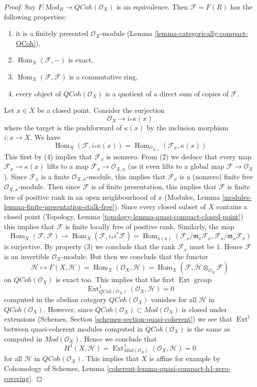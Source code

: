\documentclass{stacks-project}
\theoremstyle{plain}
\theoremstyle{definition}
\theoremstyle{remark}
\numberwithin{equation}{subsection}
\def\Hom{\mathop{\mathrm{Hom}}\nolimits}
\def\Ext{\mathop{\mathrm{Ext}}\nolimits}
\def\QCoh{\mathit{QCoh}}
\begin{document}
\begin{proof}
Say $F : \text{Mod}_R \to \QCoh(\mathcal{O}_X)$ is an equivalence.
Then $\mathcal{F} = F(R)$ has the following properties:
\begin{enumerate}
\item it is a finitely presented $\mathcal{O}_X$-module
(Lemma \ref{lemma-categorically-compact-QCoh}),
\item $\Hom_X(\mathcal{F}, -)$ is exact,
\item $\Hom_X(\mathcal{F}, \mathcal{F})$ is a commutative ring,
\item every object of $\QCoh(\mathcal{O}_X)$ is a quotient of
a direct sum of copies of $\mathcal{F}$.
\end{enumerate}
Let $x \in X$ be a closed point. Consider the surjection
$$
\mathcal{O}_X \to i_*\kappa(x)
$$
where the target is the pushforward of $\kappa(x)$ by the
inclusion morphism $i : x \to X$. We have
$$
\Hom_X(\mathcal{F}, i_*\kappa(x)) =
\Hom_{\mathcal{O}_{X, x}}(\mathcal{F}_x, \kappa(x))
$$
This first by (4) implies that $\mathcal{F}_x$ is nonzero.
From (2) we deduce that every map $\mathcal{F}_x \to \kappa(x)$
lifts to a map $\mathcal{F}_x \to \mathcal{O}_{X, x}$ (as it
even lifts to a global map $\mathcal{F} \to \mathcal{O}_X$).
Since $\mathcal{F}_x$ is a finite $\mathcal{O}_{X, x}$-module,
this implies that $\mathcal{F}_x$ is a (nonzero)
finite free $\mathcal{O}_{X, x}$-module.
Then since $\mathcal{F}$ is of finite presentation, this implies
that $\mathcal{F}$ is finite free of positive rank
in an open neighbourhood of $x$
(Modules, Lemma \ref{modules-lemma-finite-presentation-stalk-free}).
Since every closed subset of $X$ contains a closed point 
(Topology, Lemma \ref{topology-lemma-quasi-compact-closed-point})
this implies that $\mathcal{F}$ is finite locally free of positive rank.
Similarly, the map
$$
\Hom_X(\mathcal{F}, \mathcal{F}) \to
\Hom_X(\mathcal{F}, i_*i^*\mathcal{F}) =
\Hom_{\kappa(x)}(\mathcal{F}_x/\mathfrak m_x \mathcal{F}_x,
\mathcal{F}_x/\mathfrak m_x \mathcal{F}_x)
$$
is surjective. By property (3) we conclude that the rank $\mathcal{F}_x$
must be $1$. Hence $\mathcal{F}$ is an invertible $\mathcal{O}_X$-module.
But then we conclude that the functor
$$
\mathcal{H}
\longmapsto
\Gamma(X, \mathcal{H}) = \Hom_X(\mathcal{O}_X, \mathcal{H}) =
\Hom_X(\mathcal{F}, \mathcal{H} \otimes_{\mathcal{O}_X} \mathcal{F})
$$
on $\QCoh(\mathcal{O}_X)$ is exact too. This implies that the first
$\Ext$ group
$$
\Ext^1_{\QCoh(\mathcal{O}_X)}(\mathcal{O}_X, \mathcal{H}) = 0
$$
computed in the abelian category $\QCoh(\mathcal{O}_X)$ vanishes for all
$\mathcal{H}$ in $\QCoh(\mathcal{O}_X)$. However, since
$\QCoh(\mathcal{O}_X) \subset \textit{Mod}(\mathcal{O}_X)$
is closed under extensions
(Schemes, Section \ref{schemes-section-quasi-coherent})
we see that $\Ext^1$ between quasi-coherent modules
computed in $\QCoh(\mathcal{O}_X)$ is the same as computed
in $\textit{Mod}(\mathcal{O}_X)$. Hence we conclude that
$$
H^1(X, \mathcal{H}) =
\Ext^1_{\textit{Mod}(\mathcal{O}_X)}(\mathcal{O}_X, \mathcal{H}) = 0
$$
for all $\mathcal{H}$ in $\QCoh(\mathcal{O}_X)$.
This implies that $X$ is affine for example by
Cohomology of Schemes, Lemma
\ref{coherent-lemma-quasi-compact-h1-zero-covering}.
\end{proof}
\end{document}
